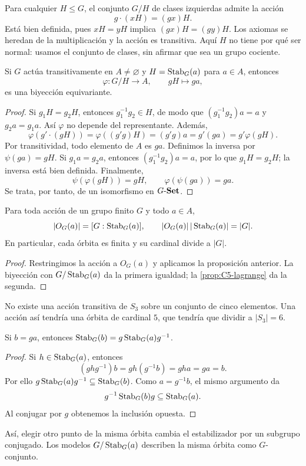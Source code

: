 Para cualquier $H\le G$, el conjunto $G/H$ de clases izquierdas admite la acción
\[
g\cdot(xH)=(gx)H.
\]
Está bien definida, pues $xH=yH$ implica $(gx)H=(gy)H$. Los axiomas se heredan de la multiplicación y la acción es transitiva. Aquí $H$ no tiene por qué ser normal: usamos el conjunto de clases, sin afirmar que sea un grupo cociente.

\begin{prop}\label{prop:C6-transitiva}
Si $G$ actúa transitivamente en $A\ne\varnothing$ y $H=\operatorname{Stab}_G(a)$ para $a\in A$, entonces
\[
\varphi:G/H\to A,\qquad gH\mapsto ga,
\]
es una biyección equivariante.
\end{prop}
\begin{proof}
Si $g_1H=g_2H$, entonces $g_1^{-1}g_2\in H$, de modo que $(g_1^{-1}g_2)a=a$ y $g_2a=g_1a$. Así $\varphi$ no depende del representante. Además,
\[
\varphi(g'\cdot(gH))=\varphi((g'g)H)=(g'g)a
=g'(ga)=g'\varphi(gH).
\]
Por transitividad, todo elemento de $A$ es $ga$. Definimos la inversa por $\psi(ga)=gH$. Si $g_1a=g_2a$, entonces $(g_1^{-1}g_2)a=a$, por lo que $g_1H=g_2H$; la inversa está bien definida. Finalmente,
\[
\psi(\varphi(gH))=gH,\qquad \varphi(\psi(ga))=ga.
\]
Se trata, por tanto, de un isomorfismo en $G\text{-}\mathbf{Set}$.
\end{proof}

\begin{coro}\label{coro:C6-orbita}
Para toda acción de un grupo finito $G$ y todo $a\in A$,
\[
|O_G(a)|=[G:\operatorname{Stab}_G(a)],\qquad
|O_G(a)|\,|\operatorname{Stab}_G(a)|=|G|.
\]
En particular, cada órbita es finita y su cardinal divide a $|G|$.
\end{coro}
\begin{proof}
Restringimos la acción a $O_G(a)$ y aplicamos la proposición anterior. La biyección con $G/\operatorname{Stab}_G(a)$ da la primera igualdad; la \cref{prop:C5-lagrange} da la segunda.
\end{proof}
\begin{ejem}
No existe una acción transitiva de $S_3$ sobre un conjunto de cinco elementos. Una acción así tendría una órbita de cardinal $5$, que tendría que dividir a $|S_3|=6$.
\end{ejem}

\begin{prop}\label{prop:C6-estabilizadores}
Si $b=ga$, entonces $\operatorname{Stab}_G(b)=g\operatorname{Stab}_G(a)g^{-1}$.
\end{prop}
\begin{proof}
Si $h\in\operatorname{Stab}_G(a)$, entonces
\[
(ghg^{-1})b=gh(g^{-1}b)=gha=ga=b.
\]
Por ello $g\operatorname{Stab}_G(a)g^{-1}\subseteq\operatorname{Stab}_G(b)$. Como $a=g^{-1}b$, el mismo argumento da
\[
g^{-1}\operatorname{Stab}_G(b)g\subseteq\operatorname{Stab}_G(a).
\]
Al conjugar por $g$ obtenemos la inclusión opuesta.
\end{proof}
Así, elegir otro punto de la misma órbita cambia el estabilizador por un subgrupo conjugado. Los modelos $G/\operatorname{Stab}_G(a)$ describen la misma órbita como $G$-conjunto.

